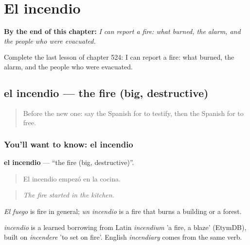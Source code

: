
\chapter{El incendio}
\label{ch:es-el-incendio}

\begin{chapteropening}
\textbf{By the end of this chapter:} \emph{I can report a fire: what burned, the alarm, and the people who were evacuated.}

Complete the last lesson of chapter 524: I can report a fire: what burned, the alarm, and the people who were evacuated.
\end{chapteropening}

\section[el incendio]{el incendio — the fire (big, destructive)}

\label{lesson:ES-C524-incendio}



\begin{quote}
Before the new one: say the Spanish for to testify, then the Spanish for to free.
\end{quote}

\subsection*{You'll want to know: el incendio}
\textbf{el incendio} — \textquotedblleft{}the fire (big, destructive)\textquotedblright{}.

\begin{quote}
El incendio empezó en la cocina.
\end{quote}

\begin{quote}
\emph{The fire started in the kitchen.}
\end{quote}

\emph{El fuego} is fire in general; \emph{un incendio} is a fire that burns a building or a forest.

\begin{cousinweb}
\emph{incendio} is a learned borrowing from Latin \emph{incendium} 'a fire, a blaze' (EtymDB), built on \emph{incendere} 'to set on fire'. English \emph{incendiary} comes from the same verb.
\end{cousinweb}

